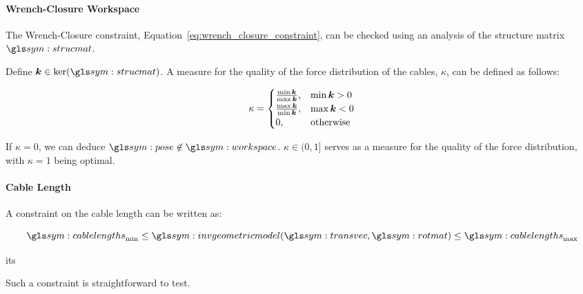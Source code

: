 			\paragraph{Wrench-Closure Workspace}%
			\label{sec:wrench_closure_workspace}

				The Wrench-Closure constraint,
				Equation~\ref{eq:wrench_closure_constraint}, can be checked
				using an analysis of the structure matrix $\strucmat$.


				Define $\vec{k} \in \ker(\strucmat)$.  A measure for the quality
				of the force distribution of the cables, $\kappa$, can  be
				defined  as follows:

				\begin{equation}
					\kappa  =
						\begin{cases}
							\frac
							{%
								\min{\vec{k}}
							}
							{%
								\max{\vec{k}}
							},
							& \min{\vec{k}} > 0
							\\
							\frac
							{%
								\max{\vec{k}}
							}
							{%
								\min{\vec{k}}
							},
							& \max{\vec{k}} < 0
							\\
							0, & \text{otherwise}
						\end{cases}
				\end{equation}

				If	$\kappa  =	0$,  we  can  deduce  $\pose  \not\in
				\workspace$.  $\kappa \in (0, 1]$ serves as a measure for the
				quality of the force distribution, with $\kappa = 1$ being
				optimal.

			\paragraph{Cable Length}%
			\label{sec:cable_length}

				A constraint on the cable length can be written as:

				\begin{equation}
					\cablelengths_{\min}
						\leq \invgeometricmodel(\transvec, \rotmatbare)
						\leq \cablelengths_{\max}
				\end{equation}

				its %

				Such a constraint is straightforward to test.


